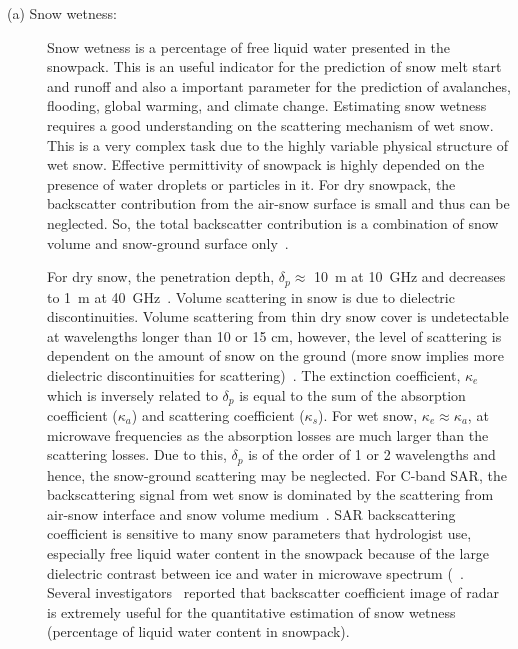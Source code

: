 \begin{description}
	\item[(a) Snow wetness: ] Snow wetness is a percentage of free liquid water presented in the snowpack. This is an useful indicator for the prediction of snow melt start and runoff and also a important parameter for the prediction of avalanches, flooding, global warming, and climate change. Estimating snow wetness requires a good understanding on the scattering mechanism of wet snow. This is a very complex task due to the highly variable physical structure of wet snow. Effective permittivity of snowpack is highly depended on the presence of water droplets or particles in it. For dry snowpack, the backscatter contribution from the air-snow surface is small and thus can be neglected. So, the total backscatter contribution is a combination of snow volume and snow-ground surface only~\citep{Shi2000}. 
	
	For dry snow, the penetration depth, $\delta_p\approx$ 10~m at 10~GHz and decreases to 1~m at 40~GHz~\citep{Rott85}. Volume scattering in snow is due to dielectric discontinuities. Volume scattering from thin dry snow cover is undetectable at wavelengths longer than 10 or 15 cm, however, the level of scattering is dependent on the amount of snow on the ground (more snow implies more dielectric discontinuities for scattering)~\citep{bernier1987microwave}. The extinction coefficient, $\kappa_e$ which is inversely related to $\delta_p$ is equal to the sum of the absorption coefficient ($\kappa_{a}$) and scattering coefficient ($\kappa_{s}$). For wet snow, $\kappa_{e}\approx\kappa_{a}$, at microwave frequencies as the absorption losses are much larger than the scattering losses. Due to this, $\delta_p$ is of the order of 1 or 2 wavelengths and hence, the snow-ground scattering may be neglected. For C-band SAR, the backscattering signal from wet snow is dominated by the scattering from air-snow interface and snow volume medium~\citep{Shi95wetness}.
	SAR backscattering coefficient is sensitive to many snow parameters that hydrologist use, especially free liquid water content in the snowpack because of the large dielectric contrast between ice and water in microwave spectrum (~\citep{Shi93}. Several investigators~\citep{Arslan05,shi1992radar,shi1997estimation,Shi95wetness,strozzi1999mapping,Singh2007_spie,singh2010snow} reported that backscatter coefficient image of radar is extremely useful for the quantitative estimation of snow wetness (percentage of liquid water content in snowpack).
	 

\end{description}
